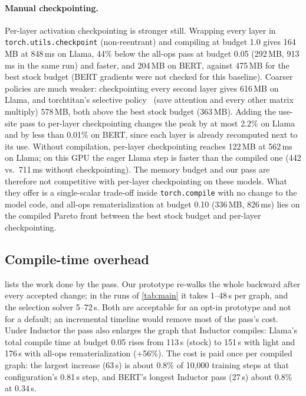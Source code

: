 \documentclass[10pt]{article}
\newcommand{\code}[1]{\texttt{#1}}
\begin{document}
\paragraph{Manual checkpointing.} Per-layer activation checkpointing is stronger still. Wrapping every layer in
\code{torch.utils.checkpoint} (non-reentrant) and compiling at budget 1.0 gives 164\,MB at 848\,ms on Llama, 44\% below
the all-ops pass at budget 0.05 (292\,MB, 913\,ms in the same run) and faster, and 204\,MB on BERT, against 475\,MB for the best stock
budget (BERT gradients were not checked for this baseline). Coarser policies are much weaker: checkpointing every second
layer gives 616\,MB on Llama, and torchtitan's selective policy~\citep{liang2025torchtitan} (save attention and every
other matrix multiply) 578\,MB, both above the best stock budget (363\,MB). Adding the use-site
pass to per-layer checkpointing changes the peak by at most 2.2\% on Llama and by less than 0.01\% on BERT, since each layer is
already recomputed next to its use. Without compilation, per-layer checkpointing reaches 122\,MB at 562\,ms on Llama; on
this GPU the eager Llama step is faster than the compiled one (442 vs.\ 711\,ms without checkpointing). The memory budget and our pass are therefore
not competitive with per-layer checkpointing on these models. What they offer is a single-scalar trade-off inside
\code{torch.compile} with no change to the model code, and all-ops rematerialization at budget 0.10 (336\,MB, 826\,ms) lies
on the compiled Pareto front between the best stock budget and per-layer checkpointing.

\subsection{Compile-time overhead}
 lists the work done by the pass. Our prototype re-walks the whole backward after every accepted change;
in the runs of \cref{tab:main} it takes 1--48\,s per graph, and the selection solver 5--72\,s. Both are acceptable for
an opt-in prototype and not for a default; an incremental timeline would remove most of the pass's cost. Under Inductor
the pass also enlarges the graph that Inductor compiles: Llama's total compile time at budget 0.05 rises from 113\,s
(stock) to 151\,s with light and 176\,s with all-ops rematerialization (+56\%). The cost is paid once per compiled graph:
the largest increase (63\,s) is about 0.8\% of 10,000 training steps at that configuration's 0.81\,s step, and BERT's
longest Inductor pass (27\,s) about 0.8\% at 0.34\,s.
\end{document}
